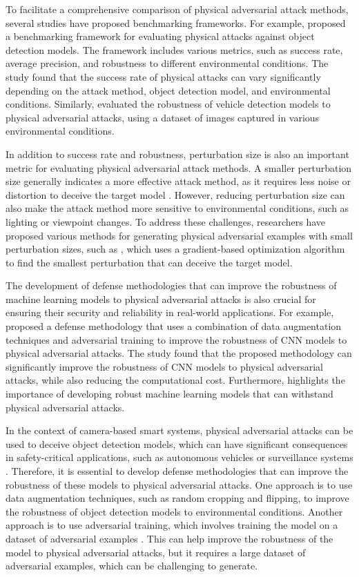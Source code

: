 \documentclass[11pt]{article}
\begin{document}
To facilitate a comprehensive comparison of physical adversarial attack methods, several studies have proposed benchmarking frameworks. For example, \cite{ref93} proposed a benchmarking framework for evaluating physical attacks against object detection models. The framework includes various metrics, such as success rate, average precision, and robustness to different environmental conditions. The study found that the success rate of physical attacks can vary significantly depending on the attack method, object detection model, and environmental conditions. Similarly, \cite{ref94} evaluated the robustness of vehicle detection models to physical adversarial attacks, using a dataset of images captured in various environmental conditions.

In addition to success rate and robustness, perturbation size is also an important metric for evaluating physical adversarial attack methods. A smaller perturbation size generally indicates a more effective attack method, as it requires less noise or distortion to deceive the target model \cite{ref95}. However, reducing perturbation size can also make the attack method more sensitive to environmental conditions, such as lighting or viewpoint changes. To address these challenges, researchers have proposed various methods for generating physical adversarial examples with small perturbation sizes, such as \cite{ref96}, which uses a gradient-based optimization algorithm to find the smallest perturbation that can deceive the target model.

The development of defense methodologies that can improve the robustness of machine learning models to physical adversarial attacks is also crucial for ensuring their security and reliability in real-world applications. For example, \cite{ref97} proposed a defense methodology that uses a combination of data augmentation techniques and adversarial training to improve the robustness of CNN models to physical adversarial attacks. The study found that the proposed methodology can significantly improve the robustness of CNN models to physical adversarial attacks, while also reducing the computational cost. Furthermore, \cite{ref98} highlights the importance of developing robust machine learning models that can withstand physical adversarial attacks.

In the context of camera-based smart systems, physical adversarial attacks can be used to deceive object detection models, which can have significant consequences in safety-critical applications, such as autonomous vehicles or surveillance systems \cite{ref99}. Therefore, it is essential to develop defense methodologies that can improve the robustness of these models to physical adversarial attacks. One approach is to use data augmentation techniques, such as random cropping and flipping, to improve the robustness of object detection models to environmental conditions. Another approach is to use adversarial training, which involves training the model on a dataset of adversarial examples \cite{ref100}. This can help improve the robustness of the model to physical adversarial attacks, but it requires a large dataset of adversarial examples, which can be challenging to generate.
\end{document}
